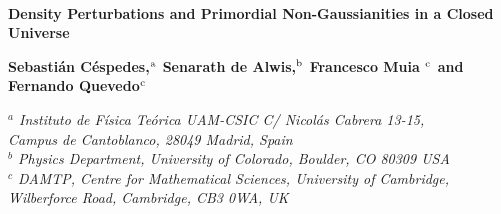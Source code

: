 \documentclass[a4paper,11pt]{article}
\title{}
\author{}
\numberwithin{equation}{section}
\numberwithin{equation}{section}
\begin{document}
%
%
\begin{titlepage}



\vspace{-0.5cm} {} \\
\vspace{1cm}
%
\begin{center}
{\huge\bf{
Density Perturbations and Primordial Non-Gaussianities in a Closed Universe\\[0.3cm]}}

\vspace{1.2truecm}


{\fontsize{10.5}{18}\selectfont
{\bf Sebasti\'an C\'espedes,${}^{\rm a}$ Senarath de Alwis,${}^{\rm b}$ Francesco Muia ${}^{\rm c}$ and Fernando Quevedo${}^{\rm c}$
}}
\vspace{.5truecm}




{\small{\it $^{a}$ Instituto de F\'{i}sica Te\'orica UAM-CSIC
C/ Nicol\'as Cabrera 13-15, \\ Campus de Cantoblanco, 28049 Madrid, Spain}}  \\ 
  {\small {\it $^{b}$ Physics Department, University of Colorado, Boulder, CO 80309 USA}}\\
{\small {\it $^{c}$ DAMTP,  Centre for Mathematical Sciences,  University of Cambridge,\\ Wilberforce Road,  Cambridge, CB3 0WA, UK}}
 
 
  \vskip 2.2cm
 

\end{center}
\end{titlepage}
\end{document}
